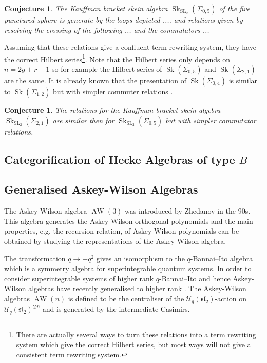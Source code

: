 \documentclass{article}
\newcommand{\Sk}{\operatorname{Sk}}
\newcommand{\AW}{\operatorname{AW}}
\newcommand{\SL}{\operatorname{SL}}
\newcommand{\slgroup}{\mathfrak{sl}}
\newtheorem{conj}[thm]{Conjecture}
\begin{document}
\begin{conj} The Kauffman bracket skein algebra $\Sk_{\SL_2}(\Sigma_{0,5})$ of the five punctured sphere is generate by the loops depicted .... and relations given by resolving the crossing of the following ... and the commutators ...
\end{conj}

Assuming that these relations give a confluent term rewriting system, they have the correct Hilbert series\footnote{There are actually several ways to turn these relations into a term rewriting system which give the correct Hilbert series, but most ways will not give a consistent term rewriting system.}. Note that the Hilbert series only depends on $n=2g + r - 1$ so for example the Hilbert series of $\Sk(\Sigma_{0,5})$ and $\Sk(\Sigma_{2,1})$ are the same. It is already known that the presentation of $\Sk(\Sigma_{0,4})$ is similar to $\Sk(\Sigma_{1,2})$ but with simpler commuter relations \cite{BullockPrzytycki00}. 
\begin{conj}
The relations for the Kauffman bracket skein algebra $\Sk_{\SL_2}(\Sigma_{2,1})$ are similar then for $\Sk_{\SL_2}(\Sigma_{0,5})$  but with simpler commutator relations.
\end{conj}


\subsection{Categorification of Hecke Algebras of type $B$}

\subsection{Generalised Askey-Wilson Algebras}

The Askey-Wilson algebra $\AW(3)$ was introduced by Zhedanov in the 90s. This algebra generates the Askey-Wilson orthogonal polynomials and the main properties, e.g. the recursion relation, of Askey-Wilson polynomials can be obtained by studying the representations of the Askey-Wilson algebra.

The transformation $q \to -q^2$ gives an isomorphism to the $q$-Bannai--Ito algebra which is a symmetry algebra for superintegrable quantum systems. In order to consider superintegrable systems of higher rank $q$-Bannai--Ito and hence Askey-Wilson algebras have recently generalised to higher rank \cite{PostWalter}. The Askey-Wilson algebras $\AW(n)$ is defined to be the centraliser of the $\mathcal{U}_q(\slgroup_2)$-action on $\mathcal{U}_q(\slgroup_2)^{\otimes n}$ and is generated by the intermediate Casimirs. 
\end{document}

